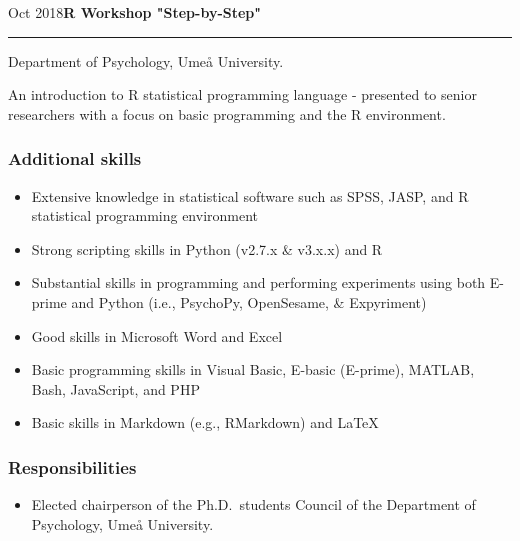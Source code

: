 \documentclass[]{article}
\providecommand{\tightlist}{%
  \setlength{\itemsep}{0pt}\setlength{\parskip}{0pt}}
\begin{document}
Oct 2018\hspace{0.75cm}\textbf{R Workshop "Step-by-Step"}\vspace{1mm}

\hrule
\begin{changemargin}{2.15cm}{2.4cm}


Department of Psychology, Umeå University.

An introduction to R statistical programming language - presented to senior researchers with a focus on basic programming and the R environment.

\end{changemargin}

\hypertarget{additional-skills}{%
\subsubsection{Additional skills}\label{additional-skills}}

\begin{itemize}
\tightlist
\item
  Extensive knowledge in statistical software such as SPSS, JASP, and R
  statistical programming environment
\item
  Strong scripting skills in Python (v2.7.x \& v3.x.x) and R
\item
  Substantial skills in programming and performing experiments using
  both E-prime and Python (i.e., PsychoPy, OpenSesame, \& Expyriment)
\item
  Good skills in Microsoft Word and Excel
\item
  Basic programming skills in Visual Basic, E-basic (E-prime), MATLAB,
  Bash, JavaScript, and PHP
\item
  Basic skills in Markdown (e.g., RMarkdown) and \LaTeX
\end{itemize}

\hypertarget{responsibilities}{%
\subsubsection{Responsibilities}\label{responsibilities}}

\begin{itemize}
\tightlist
\item
  Elected chairperson of the Ph.D.~students Council of the Department of
  Psychology, Umeå University.
\end{itemize}

\newpage
\pagestyle{empty}
\end{document}
